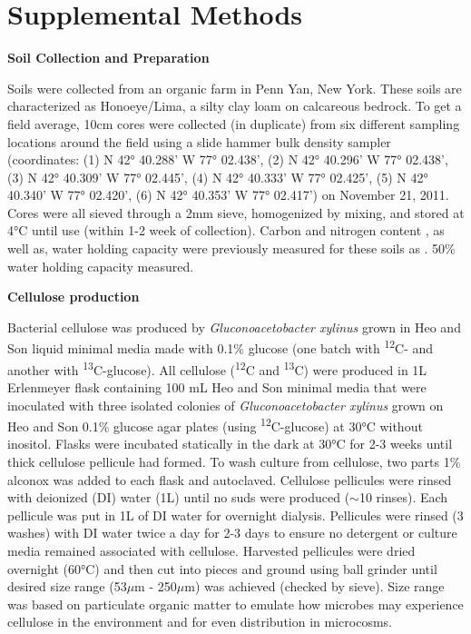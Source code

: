 \section{Supplemental Methods}


\textbf{Soil Collection and Preparation}



Soils were collected from an organic farm in Penn Yan, New York.  These soils are characterized as Honoeye/Lima, a silty clay loam on calcareous bedrock. To get a field average, 10cm cores were collected (in duplicate) from six different sampling locations around the field using a slide hammer bulk density sampler (coordinates: (1) N 42° 40.288’ W 77° 02.438’, (2) N 42° 40.296’ W 77° 02.438’, (3) N 42° 40.309’ W 77° 02.445’, (4) N 42° 40.333’ W 77° 02.425’, (5) N 42° 40.340’ W 77° 02.420’, (6) N 42° 40.353’ W 77° 02.417’) on November 21, 2011.   Cores were all sieved through a 2mm sieve, homogenized by mixing, and stored at 4°C until use (within 1-2 week of collection).  Carbon and nitrogen content , as well as, water holding capacity were previously measured for these soils as .  
50\% water holding capacity measured. 



\textbf{Cellulose production}



Bacterial cellulose was produced by \textit{Gluconoacetobacter xylinus} grown in Heo and Son \cite{Heo_2002} liquid minimal media made with 0.1\% glucose (one batch with \textsuperscript{12}C- and another with \textsuperscript{13}C-glucose). All cellulose (\textsuperscript{12}C and \textsuperscript{13}C) were produced in 1L Erlenmeyer flask containing 100 mL Heo and Son minimal media that were inoculated with three isolated colonies of \textit{Gluconoacetobacter xylinus} grown on Heo and Son 0.1\% glucose agar plates (using \textsuperscript{12}C-glucose) at 30°C without inositol. Flasks were incubated statically in the dark at 30°C for 2-3 weeks until thick cellulose pellicule had formed.  To wash culture from cellulose, two parts 1\% alconox was added to each flask and autoclaved. Cellulose pellicules were rinsed with deionized (DI) water (1L) until no suds were produced ($\sim$10 rinses). Each pellicule was put in 1L of DI water for overnight dialysis.  Pellicules were rinsed (3 washes) with DI water twice a day for 2-3 days to ensure no detergent or culture media remained associated with cellulose. Harvested pellicules were dried overnight (60°C) and then cut into pieces and ground using ball grinder until desired size range (53$\mu$m - 250$\mu$m) was achieved (checked by sieve). Size range was based on particulate organic matter to emulate how microbes may experience cellulose in the environment \cite{Cambardella_1992} and for even distribution in microcosms. 

